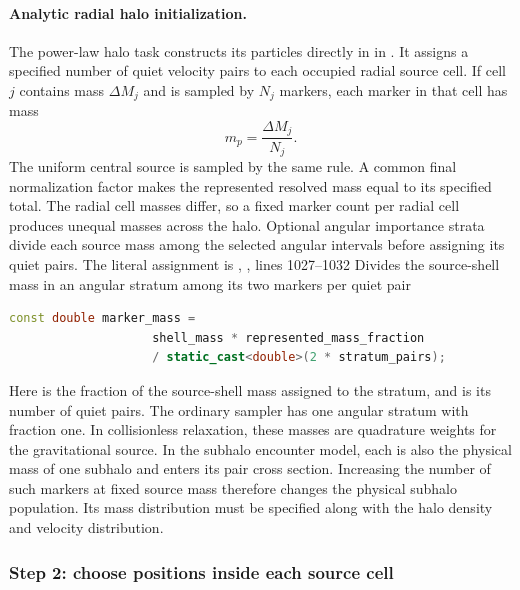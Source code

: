 \paragraph{Analytic radial halo initialization.}
The power-law halo task constructs its particles directly in
 in .
It assigns a specified number of quiet velocity pairs to each occupied
radial source cell. If cell $j$ contains mass $\Delta M_j$ and is sampled
by $N_j$ markers, each marker in that cell has mass
\begin{equation}
 m_p=\frac{\Delta M_j}{N_j}.
 \label{eq:analytic-radial-marker-mass}
\end{equation}
The uniform central source is sampled by the same rule. A common final
normalization factor makes the represented resolved mass equal to its
specified total. The radial cell masses differ, so a fixed marker count
per radial cell produces unequal masses across the halo. Optional angular importance strata divide
each source mass among the selected angular intervals before assigning
its quiet pairs. The literal assignment is
{, , lines 1027--1032}
{Divides the source-shell mass in an angular stratum among its two markers per quiet pair}
\begin{lstlisting}[language=C++]
                const double marker_mass =
                    shell_mass * represented_mass_fraction
                    / static_cast<double>(2 * stratum_pairs);
\end{lstlisting}
Here  is the fraction of the source-shell
mass assigned to the stratum, and  is its number of
quiet pairs. The ordinary sampler has one angular stratum with fraction
one. In collisionless relaxation, these masses are quadrature weights
for the gravitational source. In the subhalo encounter model,
each is also the physical mass of one subhalo and enters its pair cross
section. Increasing the number of such markers at fixed source mass
therefore changes the physical subhalo population. Its mass distribution
must be specified along with the halo density and velocity distribution.

\subsubsection{Step 2: choose positions inside each source cell}

